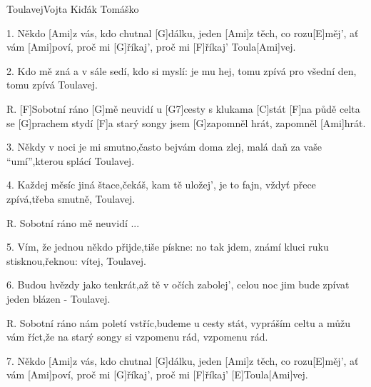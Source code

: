 \begin{song}{Toulavej}{Vojta Kiďák Tomáško}

\begin{xverse}{1. }
Někdo [Ami]z vás, kdo chutnal [G]dálku, jeden [Ami]z těch, co rozu[E]měj',
ať vám [Ami]poví, proč mi [G]{ří}kaj', proč mi [F]{ří}kaj' Toula[Ami]vej.
\end{xverse}


\begin{xverse}{2. }
Kdo mě zná a v sále sedí, kdo si myslí: je mu hej,
tomu zpívá pro všední den, tomu zpívá Toulavej.
\end{xverse}


\begin{xverse}{R. }
[F]Sobotní ráno [G]mě neuvidí u [G7]cesty s klukama [C]stát
[F]na půdě celta se [G]prachem stydí [F]a starý songy jsem [G]zapomněl hrát,
zapomněl [Ami]hrát.
\end{xverse}


\begin{xverse}{3. }
Někdy v noci je mi smutno,často bejvám doma zlej,
malá daň za vaše ``umí'',kterou splácí Toulavej.
\end{xverse}


\begin{xverse}{4. }
Každej měsíc jiná štace,čekáš, kam tě uložej',
je to fajn, vždyť přece zpívá,třeba smutně, Toulavej.
\end{xverse}

\begin{xverse}{R. }
Sobotní ráno mě neuvidí ...
\end{xverse}

\begin{xverse}{5. }
Vím, že jednou někdo přijde,tiše pískne: no tak jdem,
známí kluci ruku stisknou,řeknou: vítej, Toulavej.
\end{xverse}


\begin{xverse}{6. }
Budou hvězdy jako tenkrát,až tě v očích zabolej',
celou noc jim bude zpívat jeden blázen - Toulavej.
\end{xverse}


\begin{xverse}{R. }
Sobotní ráno nám poletí vstříc,budeme u cesty stát,
vypráším celtu a můžu vám říct,že na starý songy si vzpomenu rád,
vzpomenu rád.
\end{xverse}

\begin{xverse}{7. }
Někdo [Ami]z vás, kdo chutnal [G]dálku, jeden [Ami]z těch, co rozu[E]měj',
ať vám [Ami]poví, proč mi [G]{ří}kaj', proč mi [F]{ří}kaj' [E]Toula[Ami]vej.
\end{xverse}
\end{song}

